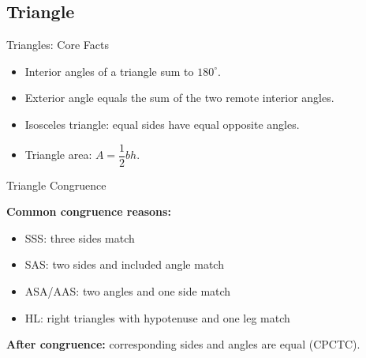 \documentclass{beamer}
\begin{document}
\begin{frame}
\section{Triangle}
\end{frame}


\begin{frame}{Triangles: Core Facts}

\begin{itemize}
    \item Interior angles of a triangle sum to $180^\circ$.
    \item Exterior angle equals the sum of the two remote interior angles.
    \item Isosceles triangle: equal sides have equal opposite angles.
    \item Triangle area: $A=\dfrac{1}{2}bh$.
\end{itemize}

\end{frame}

\begin{frame}{Triangle Congruence}

\textbf{Common congruence reasons:}
\begin{itemize}
    \item SSS: three sides match
    \item SAS: two sides and included angle match
    \item ASA/AAS: two angles and one side match
    \item HL: right triangles with hypotenuse and one leg match
\end{itemize}

\vspace{0.2cm}
\textbf{After congruence:} corresponding sides and angles are equal (CPCTC).

\end{frame}
\end{document}

